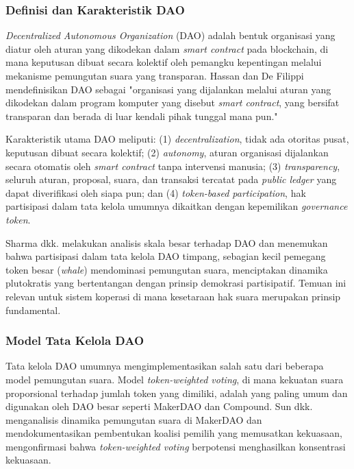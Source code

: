 \subsubsection{Definisi dan Karakteristik DAO}

\textit{Decentralized Autonomous Organization} (DAO) adalah bentuk organisasi yang diatur oleh aturan yang dikodekan dalam \textit{smart contract} pada blockchain, di mana keputusan dibuat secara kolektif oleh pemangku kepentingan melalui mekanisme pemungutan suara yang transparan. Hassan dan De Filippi \cite{hassan2021dao} mendefinisikan DAO sebagai "organisasi yang dijalankan melalui aturan yang dikodekan dalam program komputer yang disebut \textit{smart contract}, yang bersifat transparan dan berada di luar kendali pihak tunggal mana pun."

Karakteristik utama DAO meliputi: (1) \textit{decentralization}, tidak ada otoritas pusat, keputusan dibuat secara kolektif; (2) \textit{autonomy}, aturan organisasi dijalankan secara otomatis oleh \textit{smart contract} tanpa intervensi manusia; (3) \textit{transparency}, seluruh aturan, proposal, suara, dan transaksi tercatat pada \textit{public ledger} yang dapat diverifikasi oleh siapa pun; dan (4) \textit{token-based participation}, hak partisipasi dalam tata kelola umumnya dikaitkan dengan kepemilikan \textit{governance token}.

Sharma dkk. \cite{sharma2024future} melakukan analisis skala besar terhadap DAO dan menemukan bahwa partisipasi dalam tata kelola DAO timpang, sebagian kecil pemegang token besar (\textit{whale}) mendominasi pemungutan suara, menciptakan dinamika plutokratis yang bertentangan dengan prinsip demokrasi partisipatif. Temuan ini relevan untuk sistem koperasi di mana kesetaraan hak suara merupakan prinsip fundamental.

\subsubsection{Model Tata Kelola DAO}

Tata kelola DAO umumnya mengimplementasikan salah satu dari beberapa model pemungutan suara. Model \textit{token-weighted voting}, di mana kekuatan suara proporsional terhadap jumlah token yang dimiliki, adalah yang paling umum dan digunakan oleh DAO besar seperti MakerDAO dan Compound. Sun dkk. \cite{sun2022multiparty} menganalisis dinamika pemungutan suara di MakerDAO dan mendokumentasikan pembentukan koalisi pemilih yang memusatkan kekuasaan, mengonfirmasi bahwa \textit{token-weighted voting} berpotensi menghasilkan konsentrasi kekuasaan.

